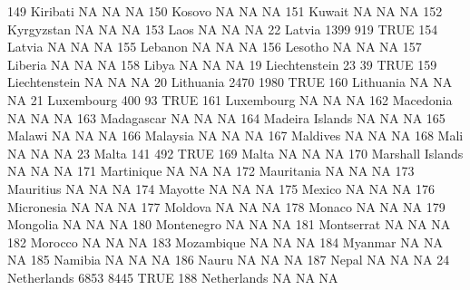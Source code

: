 \documentclass [a4paper] {article}
\begin{document}
\begin{Schunk}
\begin{Soutput}
149                            Kiribati    NA    NA   NA
150                              Kosovo    NA    NA   NA
151                              Kuwait    NA    NA   NA
152                          Kyrgyzstan    NA    NA   NA
153                                Laos    NA    NA   NA
22                               Latvia  1399   919 TRUE
154                              Latvia    NA    NA   NA
155                             Lebanon    NA    NA   NA
156                             Lesotho    NA    NA   NA
157                             Liberia    NA    NA   NA
158                               Libya    NA    NA   NA
19                        Liechtenstein    23    39 TRUE
159                       Liechtenstein    NA    NA   NA
20                            Lithuania  2470  1980 TRUE
160                           Lithuania    NA    NA   NA
21                           Luxembourg   400    93 TRUE
161                          Luxembourg    NA    NA   NA
162                           Macedonia    NA    NA   NA
163                          Madagascar    NA    NA   NA
164                     Madeira Islands    NA    NA   NA
165                              Malawi    NA    NA   NA
166                            Malaysia    NA    NA   NA
167                            Maldives    NA    NA   NA
168                                Mali    NA    NA   NA
23                                Malta   141   492 TRUE
169                               Malta    NA    NA   NA
170                    Marshall Islands    NA    NA   NA
171                          Martinique    NA    NA   NA
172                          Mauritania    NA    NA   NA
173                           Mauritius    NA    NA   NA
174                             Mayotte    NA    NA   NA
175                              Mexico    NA    NA   NA
176                          Micronesia    NA    NA   NA
177                             Moldova    NA    NA   NA
178                              Monaco    NA    NA   NA
179                            Mongolia    NA    NA   NA
180                          Montenegro    NA    NA   NA
181                          Montserrat    NA    NA   NA
182                             Morocco    NA    NA   NA
183                          Mozambique    NA    NA   NA
184                             Myanmar    NA    NA   NA
185                             Namibia    NA    NA   NA
186                               Nauru    NA    NA   NA
187                               Nepal    NA    NA   NA
24                          Netherlands  6853  8445 TRUE
188                         Netherlands    NA    NA   NA

\end{Soutput}
\end{Schunk}
\end{document}
